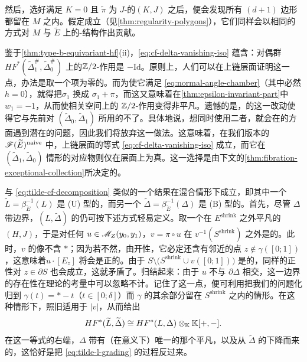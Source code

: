 然后，选好满足 $K=0$ 且 $\tilde{\pi}$ 为 $J$-\trHolomorphic{}的\trPerturbationDatum{}$(K,J)$ 之后，便会发现所有\trHolomorphic{} $(d{+}1)$ 边形都留在 $M$ 之内。假定\trRegularity{}成立（见\cref{thm:regularity-polygons}），它们同样会以相同的方式对 $M$ 与 $\widetilde{E}$ 上的\trAinfty-结构作出贡献。
\begin{remark}\label{thm:dual-action-minus-id}
鉴于\cref{thm:type-b-equivariant-hf}(ii)，\eqref{eq:cf-delta-vanishing-iso} 蕴含：对偶群 $HF^*(\widetilde{\Delta}^{\#}_1,\widetilde{\Delta}^{\#}_0)$ 上的\trCanonical{}$\mathbb{Z}/2$-作用是 $-\mathrm{Id}$。原则上，人们可以在上链层面证明这一点，办法是取一个\trInhomogeneous{}项为零的\trFloerDatum。而为使它满足 \eqref{eq:normal-angle-chamber}（其中必然 $h=0$），就得把\trNormalAngle{}$\sigma_1$ 换成 $\sigma_1+\pi$，而这又意味着在\cref{thm:epsilon-invariant-part}中 $w_1=-1$，从而使相关\trOrientation{}空间上的 $\mathbb{Z}/2$-作用变得非平凡。遗憾的是，\trNormalAngle{}的这一改动使得它与先前对 $(\widetilde{\Delta}_0,\widetilde{\Delta}_1)$ 所用的\trFloerDatum{}不\trCompatible{}了。具体地说，想同时使用二者，就会在\trPseudoholomorphic\trPolygon{}的\trEquivariant{}\trTransversality{}方面遇到潜在的问题，因此我们将放弃这一做法。这意味着，在我们版本的 $\mathscr{F}(\widetilde{E})^{\mathrm{naive}}$ 中，上链层面的等式 \eqref{eq:cf-delta-vanishing-iso} 成立，而它在 $(\widetilde{\Delta}_1,\widetilde{\Delta}_0)$ 情形的对应物则仅在\trCohomology{}层面上为真。这一选择是由下文的\cref{thm:fibration-exceptional-collection}所决定的。
\end{remark}
\begin{remark}\label{thm:mixed-floer-cohomology}
与 \eqref{eq:tilde-cf-decomposition} 类似的一个结果在混合情形下成立，即其中一个\trSubmanifold{}$\widetilde{L}=\beta_{\widetilde{E}}^{-1}(L)$ 是 (U) 型的，而另一个 $\widetilde{\Delta}=\beta_{\widetilde{E}}^{-1}(\Delta)$ 是 (B) 型的。首先，尽管 $\Delta$ 带边界，$(L,\widetilde{\Delta})$ 的\trFloerCohomology{}仍可按下述方式轻易定义。取一个在 $E^{\mathrm{shrink}}$ 之外平凡的\trFloerDatum{}$(H,J)$，于是对任何 $u\in\mathscr{M}_Z(y_0,y_1)$，$v=\pi\circ u$ 在 $v^{-1}(S^{\mathrm{shrink}})$ 之外是\trHolomorphic{}的。此时，$v$ 的像不含 $*$；因为若不然，由开性，它必定还含有邻近的点 $z\notin\gamma([0;1])$，这意味着\trIntersectionNumber{}$u\cdot[E_z]$ 将会是正的。由于 $S\setminus\bigl(S^{\mathrm{shrink}}\cup v([0;1])\bigr)$ 是\trConnected{}的，同样的正性对 $z\in\partial S$ 也会成立，这就矛盾了。归结起来：由于 $u$ 不与 $\partial\Delta$ 相交，这一边界的存在性在\trFloer{}理论的考量中可以忽略不计。记住了这一点，便可利用\trIsotopy{}\trInvariance{}把我们的问题化归到 $\gamma(t)=*-t$（$t\in[0;\delta]$）而 $\gamma$ 的其余部分留在 $S^{\mathrm{shrink}}$ 之内的情形。在这种情形下，\trMaximumPrinciple{}照旧适用于 $|v|$，从而给出
\begin{equation*}
HF^*(\widetilde{L},\widetilde{\Delta})\cong HF^*(L,\Delta)\otimes_{\mathbb{K}}\mathbb{K}[+,-].
\end{equation*}
在这一等式的右端，$\Delta$ 带有（在\trIsomorphic{}意义下）唯一的那个平凡\trPinStructure，以及从 $\widetilde{\Delta}$ 的\trGrading{}下降而来的\trGrading，这恰好是把 \eqref{eq:tilde-l-grading} 的过程反过来。
\end{remark}
